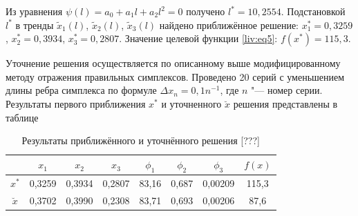 






Из уравнения $\psi(l)=a_0+a_1l+a_2l^2=0$ получено $l^\ast=10,2554$. Подстановкой $l^\ast$ в тренды $\tilde{x}_1(l)$, $\tilde{x}_2(l)$, $\tilde{x}_3(l)$ найдено приближённое решение: $x_1^\ast=0,3259$, $x_2^\ast=0,3934$, $x_3^\ast=0,2807$. Значение целевой функции \eqref{liv:eq5}: $f(x^\ast)=115,3$.



Уточнение решения осуществляется по описанному выше модифицированному методу отражения правильных симплексов. Проведено 20 серий с уменьшением длины ребра симплекса по формуле $\Delta x_n=0,1n^{-1}$, где $n$ "--- номер серии. Результаты первого приближения $x^\ast$ и уточненного $\breve{x}$ решения представлены в таблице



\begin{table}[h!]

\centering\small

\caption{Результаты приближённого и уточнённого решения [???]\label{mult:tabl:3}}\vspace{-3mm}

\begin{tabular}[h]{|c|c|c|c|c|c|c|c|}%

 \hline 

 & $x_1$ & $x_2$ & $x_3$ & $\phi_1$ & $\phi_2$ & $\phi_3$ & $f(x)$ \\

\hline


$x^\ast$ & 0,3259 & 0,3934 & 0,2807 & 83,16 & 0,687 & 0,00209 & 115,3 \\

\hline

$\breve{x}$ & 0,3702 & 0,3990 & 0,2308 & 83,71 & 0,693 & 0,00206 & 87,6 \\

\hline

\end{tabular}

\end{table}



